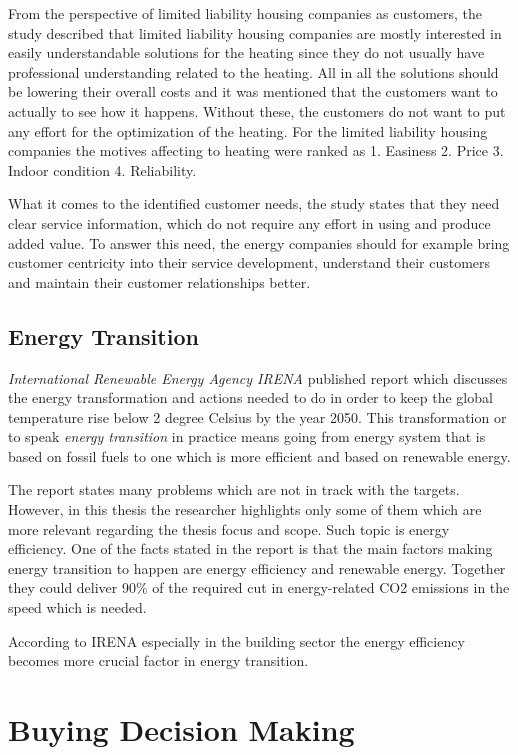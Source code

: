 From the perspective of limited liability housing companies as customers, the study \parencite{Deloitte} described that limited liability housing companies are mostly interested in easily understandable solutions for the heating since they do not usually have professional understanding related to the heating. All in all the solutions should be lowering their overall costs and it was mentioned that the customers want to actually to see how it happens. Without these, the customers do not want to put any effort for the optimization of the heating. For the limited liability housing companies the motives affecting to heating were ranked as 1. Easiness 2. Price 3. Indoor condition 4. Reliability.

What it comes to the identified customer needs, the study \parencite{Deloitte} states that they need clear service information, which do not require any effort in using and produce added value. To answer this need, the energy companies should for example bring customer centricity into their service development, understand their customers and maintain their customer relationships better.


\subsection{Energy Transition}

\emph{International Renewable Energy Agency IRENA} published report which discusses the energy transformation and actions needed to do in order to keep the global temperature rise below 2 degree Celsius by the year 2050. This transformation or to speak \emph{energy transition} in practice means going from energy  system that is based on fossil fuels to one which is more efficient and based on renewable energy.

The report \parencite{} states many problems which are not in track with the targets. However, in this thesis the researcher highlights only some of them which are more relevant regarding the thesis focus and scope. Such topic is energy efficiency. One of the facts stated in the report is that the main factors making energy transition to happen are energy efficiency and renewable energy. Together they could deliver 90\% of the required cut in energy-related CO2 emissions in the speed which is needed.

According to IRENA especially in the building sector the energy efficiency becomes more crucial factor in energy transition.

\section{Buying Decision Making }

